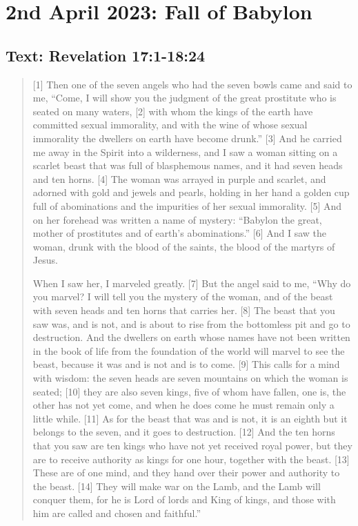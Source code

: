 \setcounter{figure}{0}

\section{2nd April 2023: Fall of Babylon}
\subsection*{Text: Revelation 17:1-18:24}
  \begin{quote}
    [1] Then one of the seven angels who had the seven bowls came and said to me, “Come, I will show you the judgment of the great prostitute who is seated on many waters, [2] with whom the kings of the earth have committed sexual immorality, and with the wine of whose sexual immorality the dwellers on earth have become drunk.” [3] And he carried me away in the Spirit into a wilderness, and I saw a woman sitting on a scarlet beast that was full of blasphemous names, and it had seven heads and ten horns. [4] The woman was arrayed in purple and scarlet, and adorned with gold and jewels and pearls, holding in her hand a golden cup full of abominations and the impurities of her sexual immorality. [5] And on her forehead was written a name of mystery: “Babylon the great, mother of prostitutes and of earth’s abominations.” [6] And I saw the woman, drunk with the blood of the saints, the blood of the martyrs of Jesus.

    When I saw her, I marveled greatly. [7] But the angel said to me, “Why do you marvel? I will tell you the mystery of the woman, and of the beast with seven heads and ten horns that carries her. [8] The beast that you saw was, and is not, and is about to rise from the bottomless pit and go to destruction. And the dwellers on earth whose names have not been written in the book of life from the foundation of the world will marvel to see the beast, because it was and is not and is to come. [9] This calls for a mind with wisdom: the seven heads are seven mountains on which the woman is seated; [10] they are also seven kings, five of whom have fallen, one is, the other has not yet come, and when he does come he must remain only a little while. [11] As for the beast that was and is not, it is an eighth but it belongs to the seven, and it goes to destruction. [12] And the ten horns that you saw are ten kings who have not yet received royal power, but they are to receive authority as kings for one hour, together with the beast. [13] These are of one mind, and they hand over their power and authority to the beast. [14] They will make war on the Lamb, and the Lamb will conquer them, for he is Lord of lords and King of kings, and those with him are called and chosen and faithful.”


\end{quote}
